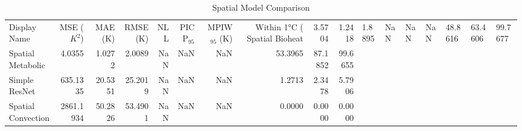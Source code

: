 \begin{table}
\caption{Spatial Model Comparison}
\begin{tabular}{lrrrrrrrrr}
\toprule
Display Name & MSE ($K^2$) & MAE (K) & RMSE (K) & NLL & PICP$_{95}$ & MPIW$_{95}$ (K) & Within 1°C (%
\midrule
Spatial Bioheat & 3.5704 & 1.2418 & 1.8895 & NaN & NaN & NaN & 48.8616 & 63.4606 & 99.7677 \\
Spatial Metabolic & 4.0355 & 1.0272 & 2.0089 & NaN & NaN & NaN & 53.3965 & 87.1852 & 99.6655 \\
Simple ResNet & 635.1335 & 20.5351 & 25.2019 & NaN & NaN & NaN & 1.2713 & 2.3478 & 5.7906 \\
Spatial Convection & 2861.1934 & 50.2826 & 53.4901 & NaN & NaN & NaN & 0.0000 & 0.0000 & 0.0000 \\
\bottomrule
\end{tabular}
\end{table}
